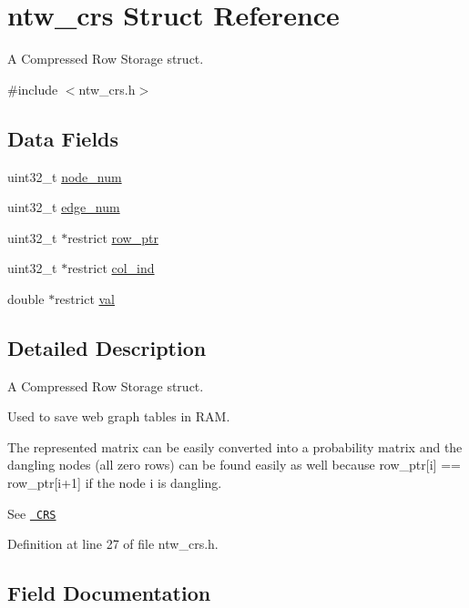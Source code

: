 \hypertarget{structntw__crs}{}\section{ntw\+\_\+crs Struct Reference}
\label{structntw__crs}


A Compressed Row Storage struct.  




{\ttfamily \#include $<$ntw\+\_\+crs.\+h$>$}

\subsection*{Data Fields}
\begin{DoxyCompactItemize}
\item 
uint32\+\_\+t \mbox{\hyperlink{structntw__crs_a36a11fbae59bf6159e40cb18e5f37ada}{node\+\_\+num}}
\item 
uint32\+\_\+t \mbox{\hyperlink{structntw__crs_a85160ebade6d93ba77c9e90f2f237cea}{edge\+\_\+num}}
\item 
uint32\+\_\+t $\ast$restrict \mbox{\hyperlink{structntw__crs_abf117885ca226f2a82ff28dca7177c34}{row\+\_\+ptr}}
\item 
uint32\+\_\+t $\ast$restrict \mbox{\hyperlink{structntw__crs_a3f5430e0836427a7da3b0bcceb3cc148}{col\+\_\+ind}}
\item 
double $\ast$restrict \mbox{\hyperlink{structntw__crs_a5ed2cc918a69051b395e9b151a66867f}{val}}
\end{DoxyCompactItemize}


\subsection{Detailed Description}
A Compressed Row Storage struct. 

Used to save web graph tables in R\+AM.

The represented matrix can be easily converted into a probability matrix and the dangling nodes (all zero rows) can be found easily as well because row\+\_\+ptr\mbox{[}i\mbox{]} == row\+\_\+ptr\mbox{[}i+1\mbox{]} if the node i is dangling.

See \href{http://netlib.org/linalg/html_templates/node91.html#SECTION00931100000000000000}\texttt{ C\+RS} 

Definition at line 27 of file ntw\+\_\+crs.\+h.



\subsection{Field Documentation}
\mbox{\label{structntw__crs_a3f5430e0836427a7da3b0bcceb3cc148}} 
